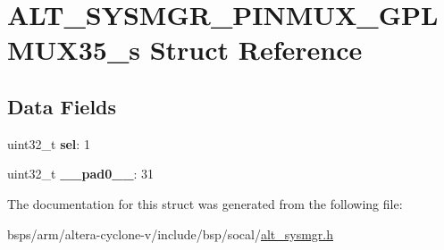 \hypertarget{structALT__SYSMGR__PINMUX__GPLMUX35__s}{}\section{A\+L\+T\+\_\+\+S\+Y\+S\+M\+G\+R\+\_\+\+P\+I\+N\+M\+U\+X\+\_\+\+G\+P\+L\+M\+U\+X35\+\_\+s Struct Reference}
\label{structALT__SYSMGR__PINMUX__GPLMUX35__s}
\subsection*{Data Fields}
\begin{DoxyCompactItemize}
\item 
\mbox{\label{structALT__SYSMGR__PINMUX__GPLMUX35__s_ae9164f36271a973063dabe14fff83345}} 
uint32\+\_\+t {\bfseries sel}\+: 1
\item 
\mbox{\label{structALT__SYSMGR__PINMUX__GPLMUX35__s_a2ffd5d0518d3d6a28d585ea5f8a3872d}} 
uint32\+\_\+t {\bfseries \+\_\+\+\_\+pad0\+\_\+\+\_\+}\+: 31
\end{DoxyCompactItemize}


The documentation for this struct was generated from the following file\+:\begin{DoxyCompactItemize}
\item 
bsps/arm/altera-\/cyclone-\/v/include/bsp/socal/\mbox{\hyperlink{alt__sysmgr_8h}{alt\+\_\+sysmgr.\+h}}\end{DoxyCompactItemize}
